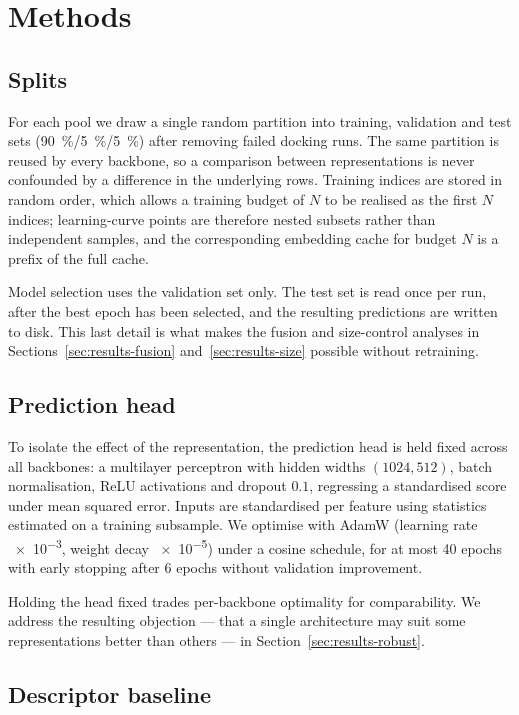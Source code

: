 \section{Methods}
\label{sec:methods}

\subsection{Splits}

For each pool we draw a single random partition into training, validation and
test sets (\SI{90}{\percent}/\SI{5}{\percent}/\SI{5}{\percent}) after removing
failed docking runs. The same partition is reused by every backbone, so a
comparison between representations is never confounded by a difference in the
underlying rows. Training indices are stored in random order, which allows a
training budget of $N$ to be realised as the first $N$ indices; learning-curve
points are therefore nested subsets rather than independent samples, and the
corresponding embedding cache for budget $N$ is a prefix of the full cache.

Model selection uses the validation set only. The test set is read once per
run, after the best epoch has been selected, and the resulting predictions are
written to disk. This last detail is what makes the fusion and size-control
analyses in Sections~\ref{sec:results-fusion} and~\ref{sec:results-size}
possible without retraining.

\subsection{Prediction head}

To isolate the effect of the representation, the prediction head is held fixed
across all backbones: a multilayer perceptron with hidden widths
$(1024, 512)$, batch normalisation, ReLU activations and dropout $0.1$,
regressing a standardised score under mean squared error. Inputs are
standardised per feature using statistics estimated on a training subsample.
We optimise with AdamW (learning rate \num{e-3}, weight decay \num{e-5}) under
a cosine schedule, for at most \num{40} epochs with early stopping after
\num{6} epochs without validation improvement.

Holding the head fixed trades per-backbone optimality for comparability. We
address the resulting objection --- that a single architecture may suit some
representations better than others --- in Section~\ref{sec:results-robust}.

\subsection{Descriptor baseline}
\label{sec:methods-baseline}


